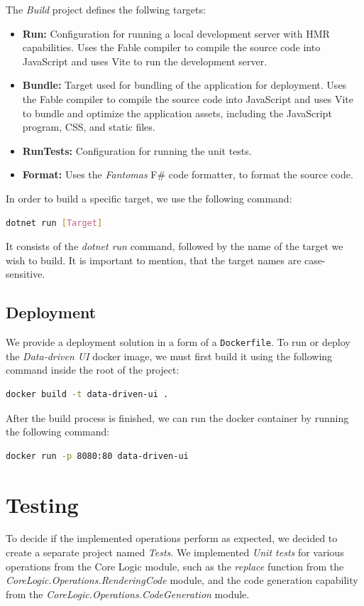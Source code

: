 The \emph{Build} project defines the follwing targets:
\begin{itemize}
	\item \textbf{Run:} Configuration for running a local development server with HMR capabilities.
	      Uses the Fable compiler to compile the source code into JavaScript and uses Vite to run the development server.
	\item \textbf{Bundle:} Target used for bundling of the application for deployment.
	      Uses the Fable compiler to compile the source code into JavaScript and uses Vite to
	      bundle and optimize the application assets, including the JavaScript program, CSS, and static files.
	\item \textbf{RunTests:} Configuration for running the unit tests.
	\item \textbf{Format:} Uses the \emph{Fantomas} F\# code formatter, to format the source code.
\end{itemize}
In order to build a specific target, we use the following command:
\begin{lstlisting}[language=bash]
  dotnet run [Target] 
\end{lstlisting}
It consists of the \emph{dotnet run} command, followed by the name of the target we wish to build.
It is important to mention, that the target names are case-sensitive.

\subsection{Deployment}
We provide a deployment solution in a form of a \texttt{Dockerfile}.
To run or deploy the \emph{Data-driven UI} docker image, we must first build it using the following command inside the root of the project:
\begin{lstlisting}[language=bash]
  docker build -t data-driven-ui .  
\end{lstlisting}

After the build process is finished, we can run the docker container by running the following command:

\begin{lstlisting}[language=bash]
   docker run -p 8080:80 data-driven-ui  
\end{lstlisting}

\section{Testing}
\label{sec:testing}
To decide if the implemented operations perform as expected, we decided to create a separate project named \emph{Tests}.
We implemented \emph{Unit tests} for various operations from the Core Logic module, such as the \emph{replace} function from the \emph{CoreLogic.Operations.RenderingCode} module, and the code generation capability from the \emph{CoreLogic.Operations.CodeGeneration} module.

